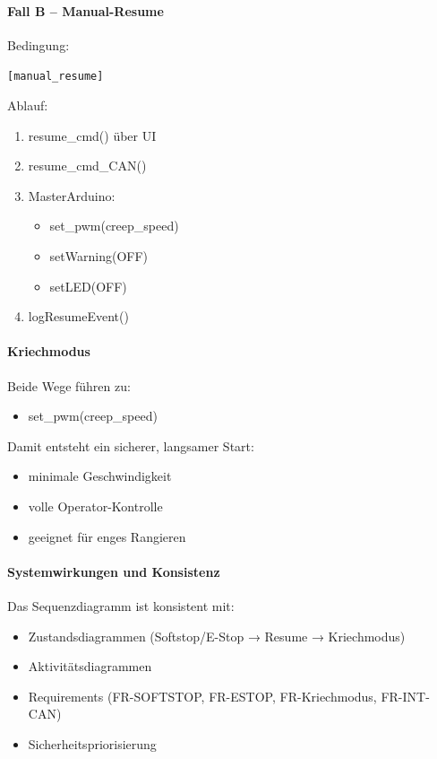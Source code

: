 \paragraph{Fall B – Manual-Resume}

Bedingung:
\begin{description}
    \item[\texttt{[manual\_resume]}]
\end{description}

Ablauf:
\begin{enumerate}
    \item resume\_cmd() über UI
    \item resume\_cmd\_CAN()
    \item MasterArduino:
    \begin{itemize}
        \item set\_pwm(creep\_speed)
        \item setWarning(OFF)
        \item setLED(OFF)
    \end{itemize}
    \item logResumeEvent()
\end{enumerate}

\paragraph{Kriechmodus}

\quad Beide Wege führen zu:
\begin{itemize}
    \item set\_pwm(creep\_speed)
\end{itemize}

\quad Damit entsteht ein sicherer, langsamer Start:
\begin{itemize}
    \item minimale Geschwindigkeit
    \item volle Operator-Kontrolle
    \item geeignet für enges Rangieren
\end{itemize}

\paragraph{Systemwirkungen und Konsistenz}

\quad Das Sequenzdiagramm ist konsistent mit:
\begin{itemize}
    \item Zustandsdiagrammen (Softstop/E-Stop → Resume → Kriechmodus)
    \item Aktivitätsdiagrammen
    \item Requirements (FR-SOFTSTOP, FR-ESTOP, FR-Kriechmodus, FR-INT-CAN)
    \item Sicherheitspriorisierung
\end{itemize}

